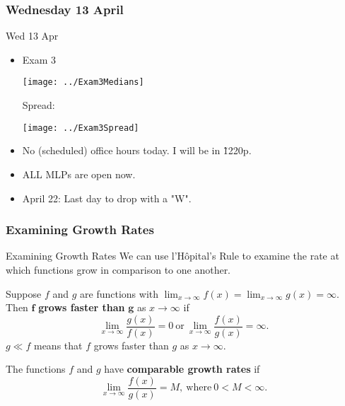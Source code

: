 \documentclass[cal1spr16Lectures.tex]{subfiles}
\begin{document}

\subsubsection{\bf Wednesday 13 April}

\begin{frame}[allowframebreaks]{Wed 13 Apr}
\begin{itemize}\footnotesize
\item Exam 3

\texttt{[image: ../Exam3Medians]}

Spread:

\begin{center}
\texttt{[image: ../Exam3Spread]}
\end{center}
\item No (scheduled) office hours today.  I will be in \~1220p.
\item ALL MLPs are open now.
\item April 22: Last day to drop with a "W".
\end{itemize}
\end{frame}

\subsubsection{Examining Growth Rates}

\begin{frame}{\small Examining Growth Rates}\footnotesize
We can use l'H\^{o}pital's Rule to examine the rate at which functions grow in comparison to one another.
\begin{dfn} Suppose $f$ and $g$ are functions with $\displaystyle\lim_{x \to \infty} f(x) = \displaystyle\lim_{x \to \infty} g(x) = \infty$.  Then $\boldsymbol{f}$ {\bf grows faster than} $\boldsymbol{g}$ as $x \to \infty$ if 
$$\lim_{x \to \infty} \frac{g(x)}{f(x)} = 0\ \text{or}\ \lim_{x \to \infty} \frac{f(x)}{g(x)} = \infty.$$
$g \ll f$ means that $f$ grows faster than $g$ as $x \to \infty$.
\end{dfn}

\begin{dfn} The functions $f$ and $g$ have {\bf comparable growth rates} if 
$$\lim_{x \to \infty} \frac{f(x)}{g(x)}=M,\ \text{where}\ 0<M<\infty.$$
\end{dfn}
\end{frame}
\end{document}
